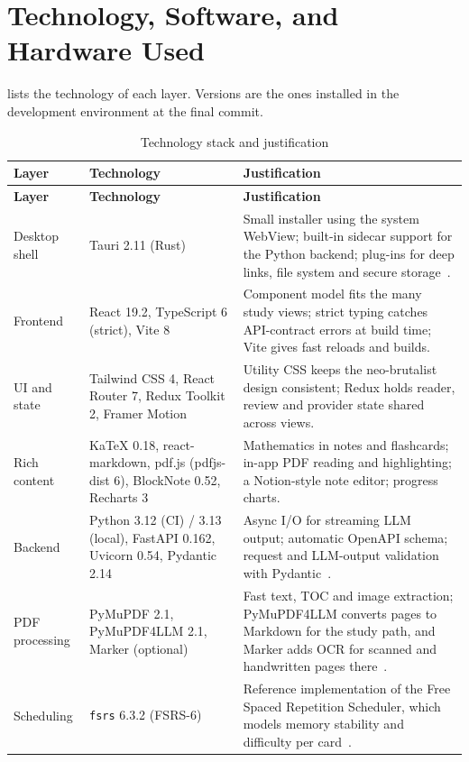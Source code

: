 \section{Technology, Software, and Hardware Used}\label{sec:tech}

 lists the technology of each layer. Versions are the ones installed in
the development environment at the final commit.

{\small
\begin{longtable}{@{}p{}p{}p{}@{}}
\caption{Technology stack and justification}\label{tab:stack}\\
\toprule
\textbf{Layer} & \textbf{Technology} & \textbf{Justification}\\
\midrule
\endfirsthead
\toprule
\textbf{Layer} & \textbf{Technology} & \textbf{Justification}\\
\midrule
\endhead
\bottomrule
\endfoot
Desktop shell & Tauri 2.11 (Rust) & Small installer using the system WebView; built-in sidecar support for the Python backend; plug-ins for deep links, file system and secure storage~\cite{tauri_docs}.\\
Frontend & React 19.2, TypeScript 6 (strict), Vite 8 & Component model fits the many study views; strict typing catches API-contract errors at build time; Vite gives fast reloads and builds.\\
UI and state & Tailwind CSS 4, React Router 7, Redux Toolkit 2, Framer Motion & Utility CSS keeps the neo-brutalist design consistent; Redux holds reader, review and provider state shared across views.\\
Rich content & KaTeX 0.18, react-markdown, pdf.js (pdfjs-dist 6), BlockNote 0.52, Recharts 3 & Mathematics in notes and flashcards; in-app PDF reading and highlighting; a Notion-style note editor; progress charts.\\
Backend & Python 3.12 (CI) / 3.13 (local), FastAPI 0.162, Uvicorn 0.54, Pydantic 2.14 & Async I/O for streaming LLM output; automatic OpenAPI schema; request and LLM-output validation with Pydantic~\cite{fastapi_docs}.\\
PDF processing & PyMuPDF 2.1, PyMuPDF4LLM 2.1, Marker (optional) & Fast text, TOC and image extraction; PyMuPDF4LLM converts pages to Markdown for the study path, and Marker adds OCR for scanned and handwritten pages there~\cite{pymupdf4llm}.\\
Scheduling & \texttt{fsrs} 6.3.2 (FSRS-6) & Reference implementation of the Free Spaced Repetition Scheduler, which models memory stability and difficulty per card~\cite{ye2022fsrs,pyfsrs}.\\

\end{longtable}}
